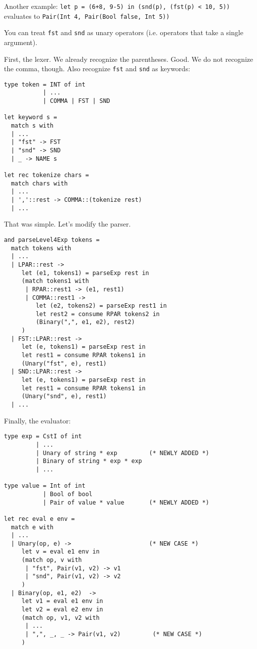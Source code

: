 \documentclass[addpoints]{exam}
\begin{document}
\begin{questions}
  Another example:
  \texttt{let p = (6+8, 9-5) in (snd(p), (fst(p) < 10, 5))}
  evaluates to \texttt{Pair(Int 4, Pair(Bool false, Int 5))}

  You can treat \texttt{fst} and \texttt{snd} as unary operators
  (i.e. operators that take a single argument).
  
  \begin{solution}
    First, the lexer.
    We already recognize the parentheses. Good.
    We do not recognize the comma, though.
    Also recognize \texttt{fst} and \texttt{snd} as keywords:

    \begin{verbatim}
type token = INT of int
           | ...
           | COMMA | FST | SND

let keyword s =
  match s with
  | ...
  | "fst" -> FST
  | "snd" -> SND
  | _ -> NAME s
  
let rec tokenize chars =
  match chars with
  | ...
  | ','::rest -> COMMA::(tokenize rest)
  | ...
    \end{verbatim}

    That was simple.
    Let's modify the parser.

    \begin{verbatim}
and parseLevel4Exp tokens =
  match tokens with
  | ...
  | LPAR::rest ->
     let (e1, tokens1) = parseExp rest in
     (match tokens1 with
      | RPAR::rest1 -> (e1, rest1)
      | COMMA::rest1 ->
         let (e2, tokens2) = parseExp rest1 in
         let rest2 = consume RPAR tokens2 in
         (Binary(",", e1, e2), rest2)
     )
  | FST::LPAR::rest ->
     let (e, tokens1) = parseExp rest in
     let rest1 = consume RPAR tokens1 in
     (Unary("fst", e), rest1)     
  | SND::LPAR::rest ->
     let (e, tokens1) = parseExp rest in
     let rest1 = consume RPAR tokens1 in
     (Unary("snd", e), rest1)     
  | ...
    \end{verbatim}

    Finally, the evaluator:

    \begin{verbatim}
type exp = CstI of int
         | ...
         | Unary of string * exp         (* NEWLY ADDED *)
         | Binary of string * exp * exp
         | ...

type value = Int of int
           | Bool of bool
           | Pair of value * value       (* NEWLY ADDED *)

let rec eval e env =
  match e with
  | ...
  | Unary(op, e) ->                      (* NEW CASE *)
     let v = eval e1 env in
     (match op, v with
      | "fst", Pair(v1, v2) -> v1
      | "snd", Pair(v1, v2) -> v2
     )
  | Binary(op, e1, e2)  ->
     let v1 = eval e1 env in
     let v2 = eval e2 env in
     (match op, v1, v2 with
      | ...
      | ",", _, _ -> Pair(v1, v2)         (* NEW CASE *)
     )
    \end{verbatim}


\end{solution}
\end{questions}
\end{document}
